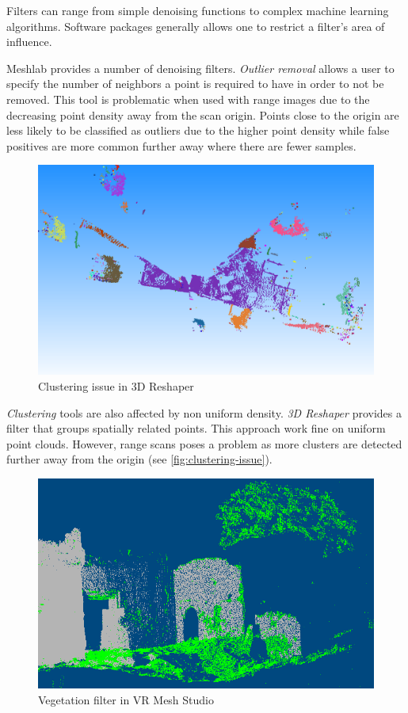 Filters can range from simple denoising functions to complex machine learning algorithms. Software packages generally allows one to restrict a filter's area of influence.

Meshlab provides a number of denoising filters. \emph{Outlier removal} allows a user to specify the number of neighbors a point is required to have in order to not be removed. This tool is problematic when used with range images due to the decreasing point density away from the scan origin. Points close to the origin are less likely to be classified as outliers due to the higher point density while false positives are more common further away where there are fewer samples.

\begin{figure}[ht]
  \centering
  \includegraphics[width=1\linewidth]{images/clustering}
  \caption{Clustering issue in 3D Reshaper \cite{Technodigit2012}}
  \label{fig:clustering-issue}
\end{figure}

\emph{Clustering} tools are also affected by non uniform density. \emph{3D Reshaper} \cite{Technodigit2012} provides a filter that groups spatially related points. This approach work fine on uniform point clouds. However, range scans poses a problem as more clusters are detected further away from the origin (see \autoref{fig:clustering-issue}).

\begin{figure}[ht]
  \centering
  \includegraphics[width=1\linewidth]{images/vrmesh-veg}
  \caption{Vegetation filter in VR Mesh Studio \cite{VirtualGrid2012}}
  \label{fig:vegetation-issue}
\end{figure}


